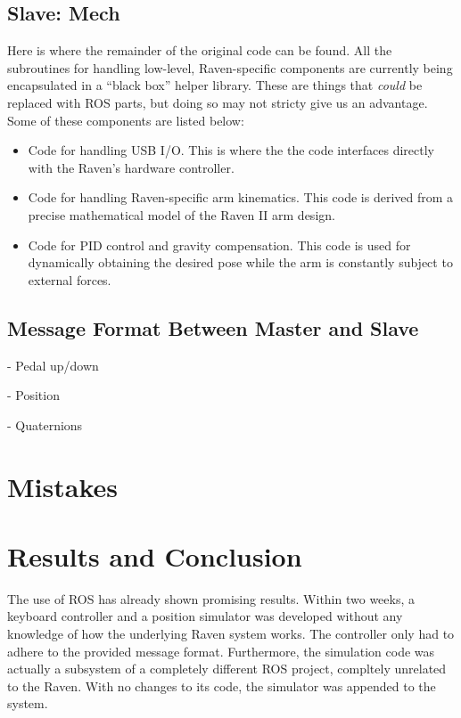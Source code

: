 \documentclass[letterpaper,twocolumn,10pt]{article}
\begin{document}
\subsection{Slave: Mech}

Here is where the remainder of the original code can be found. All the
subroutines for handling low-level, Raven-specific components are
currently being encapsulated in a ``black box'' helper library. These
are things that \emph{could} be replaced with ROS parts, but doing so
may not stricty give us an advantage. Some of these components are
listed below:

\begin{itemize}
  \item Code for handling USB I/O. This is where the the code
    interfaces directly with the Raven's hardware controller.

  \item Code for handling Raven-specific arm kinematics. This code is
    derived from a precise mathematical model of the Raven II arm
    design.

  \item Code for PID control and gravity compensation. This code is
    used for dynamically obtaining the desired pose while the arm is
    constantly subject to external forces.
\end{itemize}
 
\subsection{Message Format Between Master and Slave}
- Pedal up/down

- Position

- Quaternions

\section{Mistakes}

\section{Results and Conclusion}
The use of ROS has already shown promising results. Within two weeks,
a keyboard controller and a position simulator was developed without 
any knowledge of how the underlying Raven system works. The controller 
only had to adhere to the provided message format. Furthermore, the 
simulation code was actually a subsystem of a completely different 
ROS project, compltely unrelated to the Raven. With no changes to its 
code, the simulator was appended to the system.


\end{document}
